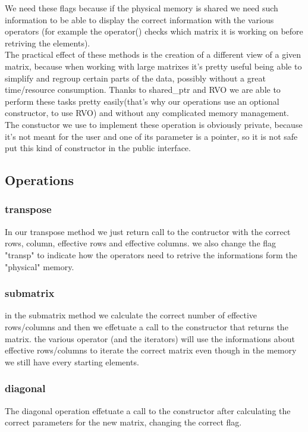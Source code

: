 \documentclass[12pt]{article}%
\begin{document}
We need these flags because if the physical memory is shared we need such information to be able to display the correct information with the various operators (for example the operator() checks which matrix it is working on before retriving the elements).\\

The practical effect of these methods is the creation of a different view of a given matrix, because when working with large matrixes it's pretty useful being able to simplify and regroup certain parts of the data, possibly without a great time/resource consumption.
Thanks to shared\_ptr and RVO we are able to perform these tasks pretty easily(that's why our operations use an optional constructor, to use RVO) and without any complicated memory management.
The constuctor we use to implement these operation is obviously private, because it's not meant for the user and one of its parameter is a pointer, so it is not safe put this kind of constructor in the public interface.\\

\subsection{Operations}
\subsubsection{transpose}
In our transpose method we just return call to the contructor with the correct rows, column, effective rows and effective columns. we also change the flag "transp" to indicate how the operators need to retrive the informations form the "physical" memory.

\subsubsection{submatrix}
in the submatrix method we calculate the correct number of effective rows/columns and then we effetuate a call to the constructor that returns the matrix.
the various operator (and the iterators) will use the informations about effective rows/columns to iterate the correct matrix even though in the memory we still have every starting elements.

\subsubsection{diagonal}
The diagonal operation effetuate a call to the constructor after calculating the correct parameters for the new matrix, changing the correct flag.
\end{document}
